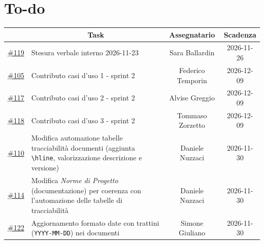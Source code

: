 \documentclass[11pt, a4paper]{article}
\begin{document}
\section{To-do}
\begin{center}
    \renewcommand{\arraystretch}{1.5}
    \begin{tabularx}{\textwidth}{|c|X|c|c|}
        \hline
        \rowcolor{gray!10} 
        \multicolumn{1}{|c|}{\textbf{ID issue}} & 
        \multicolumn{1}{c|}{\textbf{Task}} & 
        \multicolumn{1}{c|}{\textbf{Assegnatario}} & 
        \multicolumn{1}{c|}{\textbf{Scadenza}} \\
        \hline
         \href{https://github.com/On-By-One-Team/On-By-One.github.io/issues/119}{\#119} & Stesura verbale interno 2026-11-23 & Sara Ballardin & 2026-11-26 \\
        \hline
        \href{https://github.com/On-By-One-Team/On-By-One.github.io/issues/105}{\#105} & Contributo casi d'uso 1 - sprint 2 & Federico Temporin & 2026-12-09 \\
        \hline
        \href{https://github.com/On-By-One-Team/On-By-One.github.io/issues/117}{\#117} & Contributo casi d'uso 2 - sprint 2 & Alvise Greggio & 2026-12-09 \\
        \hline
        \href{https://github.com/On-By-One-Team/On-By-One.github.io/issues/118}{\#118} & Contributo casi d'uso 3 - sprint 2 & Tommaso Zorzetto & 2026-12-09 \\
        \hline
        \href{https://github.com/On-By-One-Team/On-By-One.github.io/issues/110}{\#110} & Modifica automazione tabelle tracciabilità documenti (aggiunta \texttt{\textbackslash hline}, valorizzazione descrizione e versione) & Daniele Nuzzaci & 2026-11-30 \\
        \hline
        \href{https://github.com/On-By-One-Team/On-By-One.github.io/issues/114}{\#114} & Modifica \textit{Norme di Progetto} (documentazione) per coerenza con l'automazione delle tabelle di tracciabilità & Daniele Nuzzaci & 2026-11-30 \\
        \hline
        \href{https://github.com/On-By-One-Team/On-By-One.github.io/issues/122}{\#122} & Aggiornamento formato date con trattini (\texttt{YYYY-MM-DD}) nei documenti & Simone Giuliano & 2026-11-30 \\
        \hline
    \end{tabularx}
\end{center}
\end{document}
